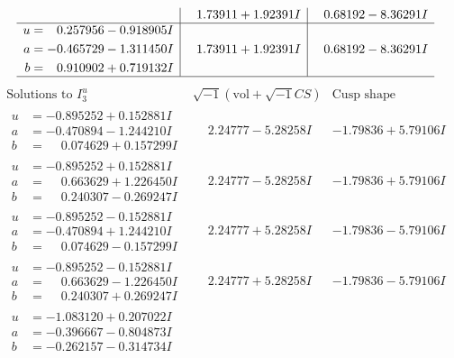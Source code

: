 \documentclass[1p]{elsarticle_modified}
\theoremstyle{definition}
\newcommand{\I}{\sqrt{-1}}
\begin{document}
$$\begin{array}{c|c|c}
 & \phantom{-}1.73911 + 1.92391 I & \phantom{-}0.68192 - 8.36291 I \\ \hline\begin{aligned}
u &= \phantom{-}0.257956 - 0.918905 I \\
a &= -0.465729 - 1.311450 I \\
b &= \phantom{-}0.910902 + 0.719132 I\end{aligned}
 & \phantom{-}1.73911 + 1.92391 I & \phantom{-}0.68192 - 8.36291 I\\
 \hline 
 \end{array}$$\newpage$$\begin{array}{c|c|c}  
\text{Solutions to }I^u_{3}& \I (\text{vol} + \sqrt{-1}CS) & \text{Cusp shape}\\
 \hline 
\begin{aligned}
u &= -0.895252 + 0.152881 I \\
a &= -0.470894 - 1.244210 I \\
b &= \phantom{-}0.074629 + 0.157299 I\end{aligned}
 & \phantom{-}2.24777 - 5.28258 I & -1.79836 + 5.79106 I \\ \hline\begin{aligned}
u &= -0.895252 + 0.152881 I \\
a &= \phantom{-}0.663629 + 1.226450 I \\
b &= \phantom{-}0.240307 - 0.269247 I\end{aligned}
 & \phantom{-}2.24777 - 5.28258 I & -1.79836 + 5.79106 I \\ \hline\begin{aligned}
u &= -0.895252 - 0.152881 I \\
a &= -0.470894 + 1.244210 I \\
b &= \phantom{-}0.074629 - 0.157299 I\end{aligned}
 & \phantom{-}2.24777 + 5.28258 I & -1.79836 - 5.79106 I \\ \hline\begin{aligned}
u &= -0.895252 - 0.152881 I \\
a &= \phantom{-}0.663629 - 1.226450 I \\
b &= \phantom{-}0.240307 + 0.269247 I\end{aligned}
 & \phantom{-}2.24777 + 5.28258 I & -1.79836 - 5.79106 I \\ \hline\begin{aligned}
u &= -1.083120 + 0.207022 I \\
a &= -0.396667 - 0.804873 I \\
b &= -0.262157 - 0.314734 I\end{aligned}

\end{array}$$
\end{document}
